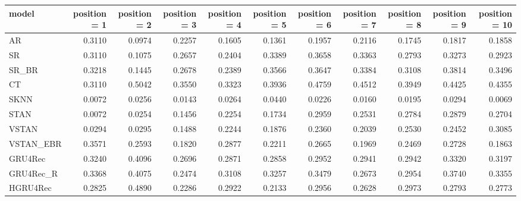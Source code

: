 \begin{tabular}{lrrrrrrrrrr}
\toprule
     model &  position = 1 &  position = 2 &  position = 3 &  position = 4 &  position = 5 &  position = 6 &  position = 7 &  position = 8 &  position = 9 &  position = 10 \\
\midrule
        AR &        0.3110 &        0.0974 &        0.2257 &        0.1605 &        0.1361 &        0.1957 &        0.2116 &        0.1745 &        0.1817 &         0.1858 \\
        SR &        0.3110 &        0.1075 &        0.2657 &        0.2404 &        0.3389 &        0.3658 &        0.3363 &        0.2793 &        0.3273 &         0.2923 \\
     SR\_BR &        0.3218 &        0.1445 &        0.2678 &        0.2389 &        0.3566 &        0.3647 &        0.3384 &        0.3108 &        0.3814 &         0.3496 \\
        CT &        0.3110 &        0.5042 &        0.3550 &        0.3323 &        0.3936 &        0.4759 &        0.4512 &        0.3949 &        0.4425 &         0.4355 \\
      SKNN &        0.0072 &        0.0256 &        0.0143 &        0.0264 &        0.0440 &        0.0226 &        0.0160 &        0.0195 &        0.0294 &         0.0069 \\
      STAN &        0.0072 &        0.0254 &        0.1456 &        0.2254 &        0.1734 &        0.2959 &        0.2531 &        0.2784 &        0.2879 &         0.2704 \\
     VSTAN &        0.0294 &        0.0295 &        0.1488 &        0.2244 &        0.1876 &        0.2360 &        0.2039 &        0.2530 &        0.2452 &         0.3085 \\
 VSTAN\_EBR &        0.3571 &        0.2593 &        0.1820 &        0.2877 &        0.2211 &        0.2665 &        0.1969 &        0.2469 &        0.2728 &         0.1863 \\
   GRU4Rec &        0.3240 &        0.4096 &        0.2696 &        0.2871 &        0.2858 &        0.2952 &        0.2941 &        0.2942 &        0.3320 &         0.3197 \\
 GRU4Rec\_R &        0.3368 &        0.4075 &        0.2474 &        0.3108 &        0.3257 &        0.3479 &        0.2673 &        0.2954 &        0.3740 &         0.3355 \\
  HGRU4Rec &        0.2825 &        0.4890 &        0.2286 &        0.2922 &        0.2133 &        0.2956 &        0.2628 &        0.2973 &        0.2793 &         0.2773 \\
\bottomrule
\end{tabular}
